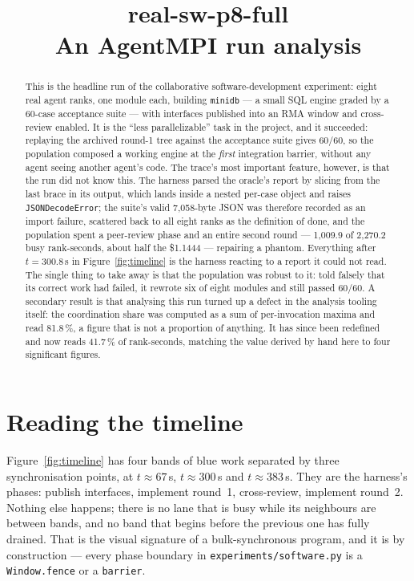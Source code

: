 \documentclass[11pt]{article}
\title{\textbf{real-sw-p8-full}\\[2pt]\large An AgentMPI run analysis}
\author{}
\date{}
\begin{document}
\maketitle

\begin{abstract}
This is the headline run of the collaborative software-development experiment: eight real
agent ranks, one module each, building \texttt{minidb} --- a small SQL engine graded by a
60-case acceptance suite --- with interfaces published into an RMA window and cross-review
enabled. It is the ``less parallelizable'' task in the project, and it succeeded: replaying
the archived round-1 tree against the acceptance suite gives 60/60, so the population
composed a working engine at the \emph{first} integration barrier, without any agent seeing
another agent's code. The trace's most important feature, however, is that the run did not
know this. The harness parsed the oracle's report by slicing from the last brace in its
output, which lands inside a nested per-case object and raises \texttt{JSONDecodeError}; the
suite's valid 7{,}058-byte JSON was therefore recorded as an import failure, scattered back
to all eight ranks as the definition of done, and the population spent a peer-review phase
and an entire second round --- 1{,}009.9 of 2{,}270.2 busy rank-seconds, about half the
\$1.1444 --- repairing a phantom. Everything after $t=300.8$\,s in Figure~\ref{fig:timeline}
is the harness reacting to a report it could not read. The single thing to take away is that
the population was robust to it: told falsely that its correct work had failed, it rewrote
six of eight modules and still passed 60/60. A secondary result is that analysing this run
turned up a defect in the analysis tooling itself: the coordination share was computed as a
sum of per-invocation maxima and read 81.8\,\%, a figure that is not a proportion of anything.
It has since been redefined and now reads 41.7\,\% of rank-seconds, matching the value derived
by hand here to four significant figures.
\end{abstract}



\section{Reading the timeline}

Figure~\ref{fig:timeline} has four bands of blue work separated by three synchronisation
points, at $t\approx67$\,s, $t\approx300$\,s and $t\approx383$\,s. They are the harness's
phases: publish interfaces, implement round~1, cross-review, implement round~2. Nothing else
happens; there is no lane that is busy while its neighbours are between bands, and no band
that begins before the previous one has fully drained. That is the visual signature of a
bulk-synchronous program, and it is by construction --- every phase boundary in
\texttt{experiments/software.py} is a \texttt{Window.fence} or a \texttt{barrier}.
\end{document}
